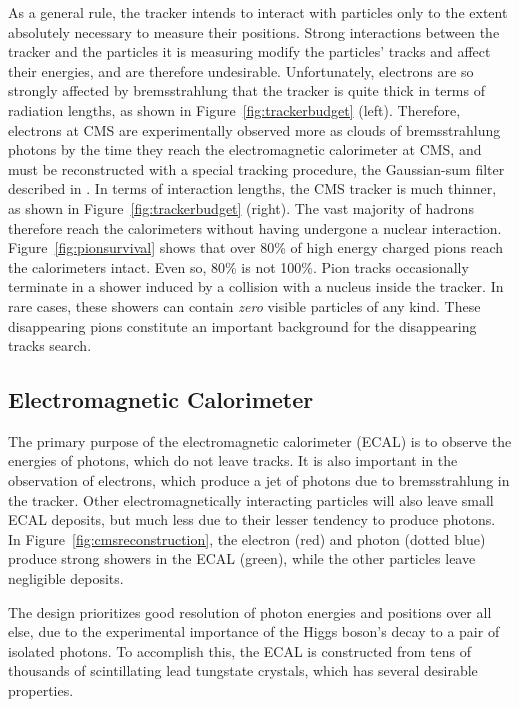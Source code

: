   As a general rule, the tracker intends to interact with particles only to the extent absolutely necessary to measure their positions.
  Strong interactions between the tracker and the particles it is measuring modify the particles' tracks and affect their energies, and are therefore undesirable.
  Unfortunately, electrons are so strongly affected by bremsstrahlung that the tracker is quite thick in terms of radiation lengths, as shown in Figure~\ref{fig:trackerbudget} (left).
  Therefore, electrons at CMS are experimentally observed more as clouds of bremsstrahlung photons by the time they reach the electromagnetic calorimeter at CMS, and must be reconstructed with a special tracking procedure, the Gaussian-sum filter described in \cite{gsftracking}.
  In terms of interaction lengths, the CMS tracker is much thinner, as shown in Figure~\ref{fig:trackerbudget} (right).
  The vast majority of hadrons therefore reach the calorimeters without having undergone a nuclear interaction.
  Figure~\ref{fig:pionsurvival} shows that over 80\% of high energy charged pions reach the calorimeters intact.
  Even so, 80\% is not 100\%.
  Pion tracks occasionally terminate in a shower induced by a collision with a nucleus inside the tracker.
  In rare cases, these showers can contain {\it zero} visible particles of any kind.
  These disappearing pions constitute an important background for the disappearing tracks search.

  \subsection{Electromagnetic Calorimeter} \label{sec:ecal}

  The primary purpose of the electromagnetic calorimeter (ECAL) is to observe the energies of photons, which do not leave tracks.
  It is also important in the observation of electrons, which produce a jet of photons due to bremsstrahlung in the tracker.
  Other electromagnetically interacting particles will also leave small ECAL deposits, but much less due to their lesser tendency to produce photons.
  In Figure~\ref{fig:cmsreconstruction}, the electron (red) and photon (dotted blue) produce strong showers in the ECAL (green), while the other particles leave negligible deposits.

  The design prioritizes good resolution of photon energies and positions over all else, due to the experimental importance of the Higgs boson's decay to a pair of isolated photons.
  To accomplish this, the ECAL is constructed from tens of thousands of scintillating lead tungstate crystals, which has several desirable properties.

